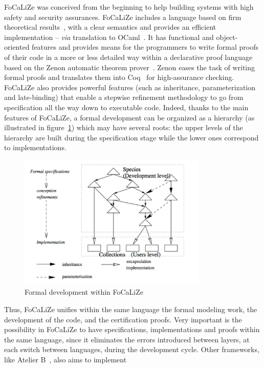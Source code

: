 \documentclass[submission,copyright,creativecommons]{eptcs}
\def\focalize{FoCaLiZe \mbox{}}
\begin{document}
\focalize was conceived from the
beginning to help building systems with high
safety and security assurances. \focalize includes
a language based on firm theoretical
results~\cite{PrevostoJAR02}, with a clear semantics and provides an efficient
implementation -- {\it via} translation to OCaml~\cite{ocamldocu}.  It has
functional and object-oriented features and
provides means for the programmers to write formal proofs
of their
code
in a more or less detailed way
within a declarative proof language based on the Zenon automatic
theorem prover~\cite{conf/lpar/BonichonDD07}.
Zenon eases the task of writing formal proofs and
translates them into Coq~\cite{coq84} for high-assurance checking.
\focalize also provides powerful features (such as
inheritance, parameterization and late-binding) that enable
a stepwise refinement methodology to go from specification all the way
down to executable code.
Indeed, thanks to
the main 
features of 
FoCaLiZe, a formal development can be organized as a
hierarchy (as illustrated in
figure~\ref{fig:focal}) which may have several roots:
the upper levels of the hierarchy are built during the specification
stage while the lower ones correspond to implementations.
\begin{figure}
  \begin{center}
    \includegraphics[width=9cm]{GFocal.pdf}
    \caption{Formal development within \focalize}
    \label{fig:focal}
  \end{center}
\end{figure}
Thus, \focalize unifies within the same language the formal modeling
work, the development of the code, and the certification proofs.
Very important is the possibility in \focalize to have
specifications, implementations and proofs within the same
language, since it
eliminates the errors introduced between layers, at each switch
between languages, during the development cycle.
Other frameworks, like Atelier B~\cite{Abrial96a}, also aims to implement
\end{document}
